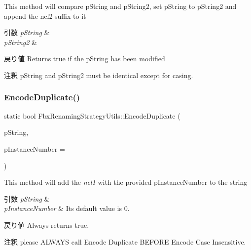 This method will compare p\+String and p\+String2, set p\+String to p\+String2 and append the ncl2 suffix to it 
\begin{DoxyParams}{引数}
{\em p\+String} & \\
\hline
{\em p\+String2} & \\
\hline
\end{DoxyParams}
\begin{DoxyReturn}{戻り値}
Returns true if the p\+String has been modified 
\end{DoxyReturn}
\begin{DoxyRemark}{注釈}
p\+String and p\+String2 must be identical except for casing. 
\end{DoxyRemark}
\mbox{\label{class_fbx_renaming_strategy_utils_a0d730b3587ae258f9ba1396080a3028f}} 
\subsubsection{\texorpdfstring{Encode\+Duplicate()}{EncodeDuplicate()}}
{\footnotesize\ttfamily static bool Fbx\+Renaming\+Strategy\+Utils\+::\+Encode\+Duplicate (\begin{DoxyParamCaption}\item[{\hyperlink{class_fbx_string}{Fbx\+String} \&}]{p\+String,  }\item[{int}]{p\+Instance\+Number = {} }\end{DoxyParamCaption})\hspace{0.3cm}{\ttfamily [static]}}

This method will add the {\itshape ncl1} with the provided p\+Instance\+Number to the string 
\begin{DoxyParams}{引数}
{\em p\+String} & \\
\hline
{\em p\+Instance\+Number} & Its default value is 0. \\
\hline
\end{DoxyParams}
\begin{DoxyReturn}{戻り値}
Always returns true. 
\end{DoxyReturn}
\begin{DoxyRemark}{注釈}
please A\+L\+W\+A\+YS call Encode Duplicate B\+E\+F\+O\+RE Encode Case Insensitive. 
\end{DoxyRemark}
\mbox{\label{class_fbx_renaming_strategy_utils_aa17397b689280294198b5d445c67c95b}} 
